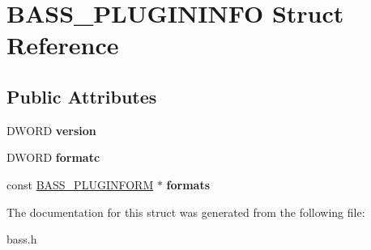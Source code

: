 \hypertarget{structBASS__PLUGININFO}{}\section{B\+A\+S\+S\+\_\+\+P\+L\+U\+G\+I\+N\+I\+N\+F\+O Struct Reference}
\label{structBASS__PLUGININFO}
\subsection*{Public Attributes}
\begin{DoxyCompactItemize}
\item 
\hypertarget{structBASS__PLUGININFO_a893c8f212060896e986b82487c9710a2}{}D\+W\+O\+R\+D {\bfseries version}\label{structBASS__PLUGININFO_a893c8f212060896e986b82487c9710a2}

\item 
\hypertarget{structBASS__PLUGININFO_a45daf6218ce12dd4e8fc01316b9852e9}{}D\+W\+O\+R\+D {\bfseries formatc}\label{structBASS__PLUGININFO_a45daf6218ce12dd4e8fc01316b9852e9}

\item 
\hypertarget{structBASS__PLUGININFO_a887355ebae589a33b61d5736699f12c2}{}const \hyperlink{structBASS__PLUGINFORM}{B\+A\+S\+S\+\_\+\+P\+L\+U\+G\+I\+N\+F\+O\+R\+M} $\ast$ {\bfseries formats}\label{structBASS__PLUGININFO_a887355ebae589a33b61d5736699f12c2}

\end{DoxyCompactItemize}


The documentation for this struct was generated from the following file\+:\begin{DoxyCompactItemize}
\item 
bass.\+h\end{DoxyCompactItemize}

